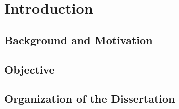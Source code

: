 \chapter{Introduction}

\section{Background and Motivation}

\section{Objective}

\section{Organization of the Dissertation}

